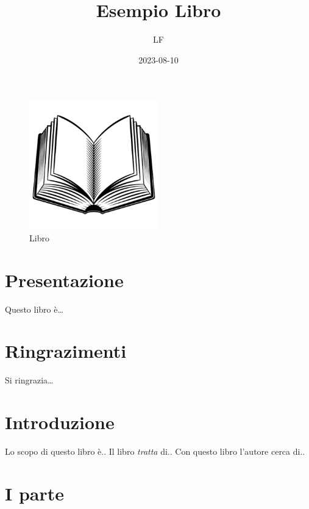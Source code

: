 \documentclass[
]{book}
\title{Esempio Libro}
\author{LF}
\date{2023-08-10}
\begin{document}
\maketitle

{
\setcounter{tocdepth}{1}
\tableofcontents
}
\begin{figure}
\centering
\includegraphics[width=0.5\textwidth,height=\textheight]{images/logo.png}
\caption{Libro}
\end{figure}

\hypertarget{presentazione}{%
\chapter*{Presentazione}\label{presentazione}}

Questo libro è\ldots{}

\hypertarget{ringrazimenti}{%
\chapter*{Ringrazimenti}\label{ringrazimenti}}

Si ringrazia\ldots{}

\hypertarget{introduzione}{%
\chapter*{Introduzione}\label{introduzione}}

Lo scopo di questo libro è..
Il libro \emph{tratta} di..
Con questo libro l'autore cerca di..

\hypertarget{i-parte}{%
\chapter*{I parte}\label{i-parte}}
\end{document}
